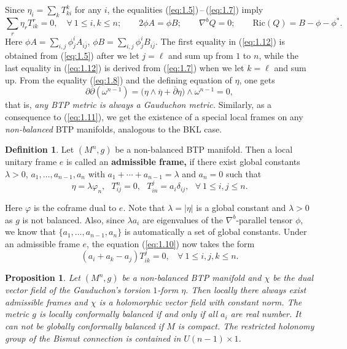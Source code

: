 \documentclass{amsart}
\numberwithin{equation}{section}
\newtheorem{proposition}[theorem]{Proposition}
\theoremstyle{definition}
\newtheorem{definition}  [theorem]     {Definition}
\renewcommand{\1}{\mathds{1}}
\renewcommand{\>}{\rightarrow}
\begin{document}
Since $\eta_i =\sum_k T^k_{ki}$ for any $i$, the equalities (\ref{eq:1.5})\,--\,(\ref{eq:1.7}) imply
\begin{equation} \label{eq:1.12}
\sum_r \eta_r T^r_{ik} = 0, \quad \forall\  1 \leq i,k \leq n;
\qquad 2\phi A = \phi B;
\qquad  \nabla^b Q = 0;
\qquad \mathrm{Ric}(Q)= B - \phi - \phi^{\ast} .
\end{equation}
Here $\phi A =\sum_{i,j} \phi^i_j A_{i\bar{j}} $,  $\phi B =\sum_{i,j} \phi^i_j B_{i\bar{j}} $.
The first equality in (\ref{eq:1.12}) is obtained from (\ref{eq:1.5}) after we let $j=\ell$ and sum up from $1$ to $n$, while the last equality in (\ref{eq:1.12})
is derived from (\ref{eq:1.7}) when we let $k=\ell$ and sum up. From the equality (\ref{eq:1.8}) and the defining equation of $\eta$,
one gets
\begin{equation} \label{eq:1.13}
\partial \overline{\partial} (\omega^{n-1}) =  \big( \eta \wedge \overline{\eta} + \overline{\partial} \eta \big) \wedge \omega^{n-1} = 0,
\end{equation}%
that is, {\em any BTP metric is always a Gauduchon metric.} Similarly, as a consequence to (\ref{eq:1.11}), we get the existence of a special
local frames on any {\em non-balanced} BTP manifolds, analogous to the BKL case.


\begin{definition}
Let $(M^n,g)$ be a non-balanced BTP manifold.
Then a local unitary frame $e$ is called an {\bf admissible frame, }
if there exist global constants $\lambda >0$, $a_1, \ldots , a_{n-1},a_n$
with $a_1+\cdots +a_{n-1}=\lambda$ and $a_n=0$ such that
$$ \eta = \lambda \varphi_n, \ \ \ T^n_{ij}=0, \ \ \ T^j_{in}=a_i\delta_{ij}, \ \ \ \forall \ 1\leq i,j\leq n. $$
\end{definition}
Here $\varphi$ is the coframe dual to $e$. Note that $\lambda =|\eta| $ is a global constant
and $\lambda >0$ as $g$ is not balanced. Also, since $\lambda a_i$ are eigenvalues of the $\nabla^b$-parallel tensor $\phi$,
we know that $\{ a_1, \ldots , a_{n-1}, a_n\}$ is automatically a set of global constants.
Under an admissible frame $e$, the equation (\ref{eq:1.10}) now takes the form
\begin{equation} \label{eq:1.14}
(a_i+a_k-a_j)T^j_{ik}=0 , \ \ \ \ \forall \ 1\leq i,j,k\leq n.
\end{equation}

\begin{proposition} \label{prop1.7}
Let $(M^n,g)$ be a non-balanced BTP manifold and $\chi$ be the dual vector field of the Gauduchon's torsion $1$-form $\eta$.
Then locally there always exist admissible frames and $\chi$ is a holomorphic vector field with constant norm.
The metric $g$ is locally conformally balanced if and only if all $a_i$ are real number.
It can not be globally conformally balanced if $M$ is compact.
The restricted holonomy group of the Bismut connection is contained in $U(n-1) \times 1$.
\end{proposition}
\end{document}
